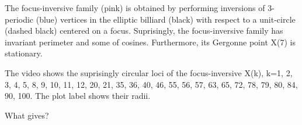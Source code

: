 The focus-inversive family (pink) is obtained by performing inversions of 3-periodic (blue) vertices in the elliptic billiard (black) with respect to a unit-circle (dashed black) centered on a focus. Suprisingly, the focus-inversive family has invariant perimeter and some of cosines. Furthermore, its Gergonne point X(7) is stationary.

The video shows the suprisingly circular loci of the focus-inversive X(k), k=1, 2, 3, 4, 5, 8, 9, 10, 11, 12, 20, 21, 35, 36, 40, 46, 55, 56, 57, 63, 65, 72, 78, 79, 80, 84, 90, 100. The plot label shows their radii.

What gives?
